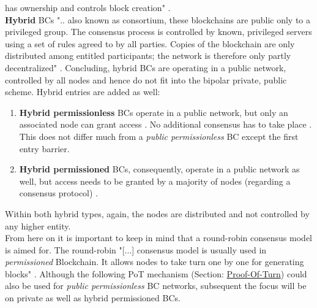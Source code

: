 \begin{enumerate}
	has ownership and controls block creation" \cite[53]{SultanK..2018}. \\
	\textbf{Hybrid} \gls{BC}s ".. also known as consortium, these blockchains are public only to a privileged group.
	The consensus process is controlled by known, privileged servers using a set of rules agreed to by all parties.
	Copies of the blockchain are only distributed among entitled participants; the network is therefore only partly decentralized" \cite[53]{SultanK..2018}.
	\noindent Concluding, hybrid \gls{BC}s are operating in a public network, controlled by all nodes and hence do not fit into the bipolar private, public scheme.
	Hybrid entries are added as well:	
	\begin{enumerate}[start=5]
		\item \textbf{Hybrid permissionless} \gls{BC}s operate in a public network, but only an associated node can grant access \cite[53]{SultanK..2018}.
		No additional consensus has to take place \cite[53]{SultanK..2018}.
		This does not differ much from a \textit{public permissionless} \gls{BC}
		except the first entry barrier. \label{def:HybridPermissionlessBCNetworks}
		
		\item \textbf{Hybrid permissioned} \gls{BC}s, consequently, operate in a public network as well,
		but access needs to be granted by a majority of nodes (regarding a consensus protocol) \cite[53]{SultanK..2018}.	\label{def:HybridPermissionedBCNetworks}
	\end{enumerate}
	Within both hybrid types, again, the nodes are distributed and not controlled by any higher entity. \\
	
	From here on it is important to keep in mind that a round-robin consensus model is aimed for.
	The round-robin "[...] consensus model is usually used in \textit{permissioned} Blockchain. It allows nodes to take turn one by one for generating blocks" \cite[3]{Khan.2020}.
	Although the following \gls{PoT} mechanism (Section: \hyperref[chap:PoT]{Proof-Of-Turn}) could also be used for \textit{public permissionless} \gls{BC} networks,
	subsequent the focus will be on private as well as hybrid permissioned \gls{BC}s.
	

\end{enumerate}

